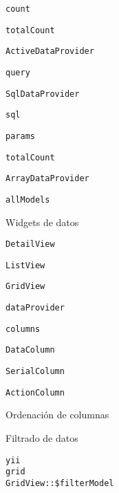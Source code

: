 \begin{longenum}
\begin{longenum}
\begin{longenum}
\begin{longenum}
                \item \texttt{count}
                \item \texttt{totalCount}
            \end{longenum}
            \item \texttt{ActiveDataProvider}
            \begin{longenum}
                \item \texttt{query}
            \end{longenum}
            \item \texttt{SqlDataProvider}
            \begin{longenum}
                \item \texttt{sql}
                \item \texttt{params}
                \item \texttt{totalCount}
            \end{longenum}
            \item \texttt{ArrayDataProvider}
            \begin{longenum}
                \item \texttt{allModels}
            \end{longenum}
        \end{longenum}
        \item Widgets de datos
        \begin{longenum}
            \item \texttt{DetailView}
            \item \texttt{ListView}
            \item \texttt{GridView}
            \begin{longenum}
                \item \texttt{dataProvider}
                \item \texttt{columns}
                \begin{longenum}
                    \item \texttt{DataColumn}
                    \item \texttt{SerialColumn}
                    \item \texttt{ActionColumn}
                \end{longenum}
                \item Ordenación de columnas
                \item Filtrado de datos
                \begin{longenum}
                    \item \texttt{yii\\grid\\GridView::\$filterModel}

\end{longenum}
\end{longenum}
\end{longenum}
\end{longenum}
\end{longenum}
